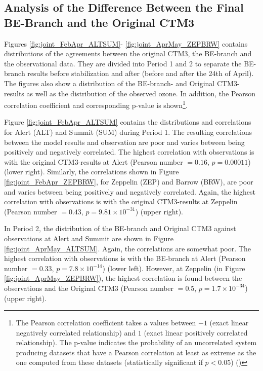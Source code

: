 \subsection{Analysis of the Difference Between the Final BE-Branch and the Original CTM3}\label{sec:res_origBE} 

Figures \ref{fig:joint_FebApr_ALTSUM}- \ref{fig:joint_AprMay_ZEPBRW} contains distributions of the agreements between the original CTM3, the BE-branch and the observational data. They are divided into Period 1 and 2 to separate the BE-branch results before stabilization and after (before and after the 24th of April). The figures also show a distribution of the BE-branch- and Original CTM3-results as well as the distribution of the observed ozone. In addition, the Pearson correlation coefficient and corresponding p-value is shown\footnote{The Pearson correlation coefficient takes a values between $-1$ (exact linear negatively correlated relationship) and $1$ (exact linear positively correlated relationship). The p-value indicates the probability of an uncorrelated system producing datasets that have a Pearson correlation at least as extreme as the one computed from these datasets (statistically significant if $p<0.05$) (\cite{WILKS201123})}.

\medskip

Figure \ref{fig:joint_FebApr_ALTSUM} contains the distributions and correlations for Alert (ALT) and Summit (SUM) during Period 1. The resulting correlations between the model results and observation are poor and varies between being positively and negatively correlated. The highest correlation with observations is with the original CTM3-results at Alert (Pearson number $=0.16$, $p = 0.00011$) (lower right). Similarly, the correlations shown in Figure \ref{fig:joint_FebApr_ZEPBRW}, for Zeppelin (ZEP) and Barrow (BRW), are poor and varies between being positively and negatively correlated. Again, the highest correlation with observations is with the original CTM3-results at Zeppelin (Pearson number $=0.43$, $p = 9.81\times10^{-31}$) (upper right). 

\medskip

In Period 2, the distribution of the BE-branch and Original CTM3 against observations at Alert and Summit are shown in Figure \ref{fig:joint_AprMay_ALTSUM}. Again, the correlations are somewhat poor. The highest correlation with observations is with the BE-branch at Alert (Pearson number $=0.33$, $p = 7.8\times10^{-14}$) (lower left). However, at Zeppelin (in Figure \ref{fig:joint_AprMay_ZEPBRW}), the highest correlation is found between the observations and the Original CTM3 (Pearson number $=0.5$, $p = 1.7\times10^{-34}$) (upper right). 



